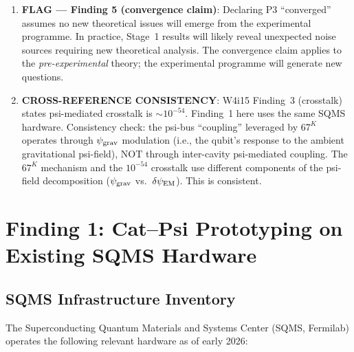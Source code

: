 \documentclass[11pt]{article}
\theoremstyle{definition}
\theoremstyle{remark}
\newcommand{\psigrav}{\psi_{\rm grav}}
\newcommand{\dpsiEM}{\delta\psi_{\rm EM}}
\begin{document}
\begin{tcolorbox}[colback=red!5!white, colframe=red!60!black,
  title=\textbf{INCONSISTENCIES AND FLAGS}]
\begin{enumerate}[nosep]
\item \textbf{FLAG --- Finding 5 (convergence claim)}: Declaring
  P3 ``converged'' assumes no new theoretical issues will emerge from
  the experimental programme.  In practice, Stage~1 results will likely
  reveal unexpected noise sources requiring new theoretical analysis.
  The convergence claim applies to the \emph{pre-experimental} theory;
  the experimental programme will generate new questions.

\item \textbf{CROSS-REFERENCE CONSISTENCY}: W4i15 Finding~3 (crosstalk)
  states psi-mediated crosstalk is $\sim 10^{-54}$.  Finding~1 here
  uses the same SQMS hardware.  Consistency check: the psi-bus
  ``coupling'' leveraged by $67^K$ operates through $\psigrav$
  modulation (i.e., the qubit's response to the ambient gravitational
  psi-field), NOT through inter-cavity psi-mediated coupling.  The
  $67^K$ mechanism and the $10^{-54}$ crosstalk use different
  components of the psi-field decomposition ($\psigrav$ vs.\
  $\dpsiEM$).  This is consistent.

\end{enumerate}
\end{tcolorbox}

\newpage

\section{Finding 1: Cat--Psi Prototyping on Existing SQMS Hardware}
\label{sec:prototyping}

\subsection{SQMS Infrastructure Inventory}

The Superconducting Quantum Materials and Systems Center (SQMS,
Fermilab) operates the following relevant hardware as of early 2026:
\end{document}
